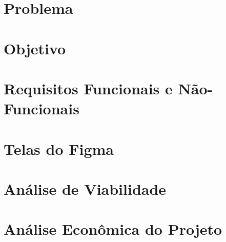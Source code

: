 \documentclass[12pt,oneside,a4paper,article]{abntex2}
\begin{document}
    \newpage                                
    \section{Problema}                      
                  
    \vspace{12mm}                           
    
    \newpage                                
    \section{Objetivo}                      
                  
    \vspace{12mm}                           
    
    \newpage                                            
    \section {Requisitos Funcionais e Não-Funcionais}   
                            
    \vspace{12mm}                                       
    
    \newpage                            %
    \section{Telas do Figma}            %
    \vspace{12mm}                       %
    
    \newpage
    \section{Análise de Viabilidade}
    
    \vspace{12mm}
    
    \newpage                                
    \section{Análise Econômica do Projeto}  
          
    \vspace{12mm}                           
    
    \newpage                                
\end{document}
